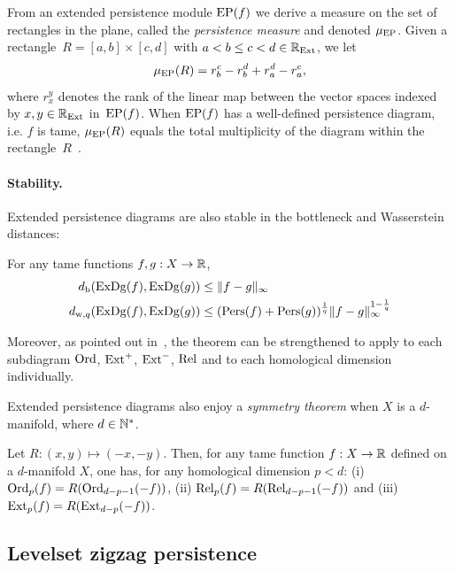 From an extended persistence module ${\rm EP}(f)$ we derive a measure on the set of rectangles in the plane, 
called the \textit{persistence measure} and denoted $\mu_{\rm EP}$. Given a rectangle~$R=[a,b]\times[c,d]$ with $a<b\leq c<d\in\mathbb{R}_{\text{Ext}}$, we let 
%
\begin{equation}\label{eq:pers_meas}
\mu_{\rm EP}(R)=r_b^c-r_b^d+r_a^d-r_a^c,
\end{equation}
%
where $r_x^y$ denotes the rank of the linear map between the vector
spaces indexed by $x,y\in\mathbb{R}_{\mathrm{Ext}}$ in~$\mathrm{EP}(f)$.
When $\mathrm{EP}(f)$ has a well-defined persistence diagram, i.e. $f$ is tame, $\mu_{\mathrm{EP}}(R)$ equals the total 
multiplicity of the diagram within the rectangle~$R$~\cite{Chazal16a}.

\paragraph*{Stability.}
Extended persistence diagrams are also stable
in the bottleneck and Wasserstein distances:
% 
\begin{thm}
\label{th:ExStab}
For any  tame functions $f,g:X\rightarrow\mathbb{R}$,
%
\begin{align}
d_{\rm b}(\mathrm{ExDg}(f),\mathrm{ExDg}(g)) & \leq \|f-g\|_\infty\\
d_{{\rm w},q}(\mathrm{ExDg}(f),\mathrm{ExDg}(g)) & \leq ({\rm Pers}(f)+{\rm Pers}(g))^{\frac 1q}\|f-g\|_\infty^{1-\frac 1q}
\end{align}
%
\end{thm}
%
Moreover, as pointed out in~\cite{Cohen09}, the theorem can be
strengthened to apply to each subdiagram
$\mathrm{Ord}$, $\mathrm{Ext}^+$, $\mathrm{Ext}^-$, $\mathrm{Rel}$ and to each homological dimension
individually.

Extended persistence diagrams also enjoy a {\em symmetry theorem} when $X$ is a $d$-manifold, where $d\in\mathbb{N}^*$.


\begin{thm}\label{th:EPsym}
Let $R:(x,y)\mapsto(-x,-y)$. Then,
for any tame function $f:X\rightarrow\mathbb{R}$ defined on a $d$-manifold $X$, one has, for any homological dimension $p <d$:
{\rm (i)} $\mathrm{Ord}_p(f)=R(\mathrm{Ord}_{d-p-1}(-f))$, 
{\rm (ii)} $\mathrm{Rel}_p(f)=R(\mathrm{Rel}_{d-p-1}(-f))$ and 
{\rm (iii)} $\mathrm{Ext}_p(f)=R(\mathrm{Ext}_{d-p}(-f))$.

\end{thm}

\subsection{Levelset zigzag persistence}
\label{sec:ZZ}

